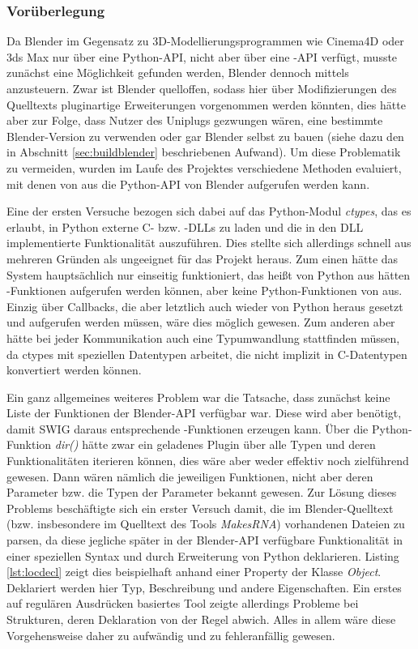 \label{sec:header}

\subsubsection{Vorüberlegung}

Da Blender im Gegensatz zu 3D-Modellierungsprogrammen wie Cinema4D oder 3ds Max nur über eine Python-API, nicht aber über eine \CC-API verfügt, musste zunächst eine Möglichkeit gefunden werden, Blender dennoch mittels \CC{} anzusteuern. Zwar ist Blender quelloffen, sodass hier über Modifizierungen des Quelltexts pluginartige Erweiterungen vorgenommen werden könnten, dies hätte aber zur Folge, dass Nutzer des Uniplugs gezwungen wären, eine bestimmte Blender-Version zu verwenden oder gar Blender selbst zu bauen (siehe dazu den in Abschnitt \ref{sec:buildblender} beschriebenen Aufwand). Um diese Problematik zu vermeiden, wurden im Laufe des Projektes verschiedene Methoden evaluiert, mit denen von \CC aus die Python-API von Blender aufgerufen werden kann.

Eine der ersten Versuche bezogen sich dabei auf das Python-Modul \emph{ctypes}, das es erlaubt, in Python externe C- bzw. \CC-DLLs zu laden und die in den DLL implementierte Funktionalität auszuführen. Dies stellte sich allerdings schnell aus mehreren Gründen als ungeeignet für das Projekt heraus. Zum einen hätte das System hauptsächlich nur einseitig funktioniert, das heißt von Python aus hätten \CC-Funktionen aufgerufen werden können, aber keine Python-Funktionen von \CC{} aus. Einzig über Callbacks, die aber letztlich auch wieder von Python heraus gesetzt und aufgerufen werden müssen, wäre dies möglich gewesen. Zum anderen aber hätte bei jeder Kommunikation auch eine Typumwandlung stattfinden müssen, da ctypes mit speziellen Datentypen arbeitet, die nicht implizit in C-Datentypen konvertiert werden können.

Ein ganz allgemeines weiteres Problem war die Tatsache, dass zunächst keine Liste der Funktionen der Blender-API verfügbar war. Diese wird aber benötigt, damit SWIG daraus entsprechende \CS-Funktionen erzeugen kann. Über die Python-Funktion \emph{dir()} hätte zwar ein geladenes Plugin über alle Typen und deren Funktionalitäten iterieren können, dies wäre aber weder effektiv noch zielführend gewesen. Dann wären nämlich die jeweiligen Funktionen, nicht aber deren Parameter bzw. die Typen der Parameter bekannt gewesen. Zur Lösung dieses Problems beschäftigte sich ein erster Versuch damit, die im Blender-Quelltext (bzw. insbesondere im Quelltext des Tools \emph{MakesRNA}) vorhandenen Dateien zu parsen, da diese jegliche später in der Blender-API verfügbare Funktionalität in einer speziellen Syntax und durch Erweiterung von Python deklarieren. Listing \ref{lst:locdecl} zeigt dies beispielhaft anhand einer Property der Klasse \emph{Object}. Deklariert werden hier Typ, Beschreibung und andere Eigenschaften. Ein erstes auf regulären Ausdrücken basiertes Tool zeigte allerdings Probleme bei Strukturen, deren Deklaration von der Regel abwich. Alles in allem wäre diese Vorgehensweise daher zu aufwändig und zu fehleranfällig gewesen.

